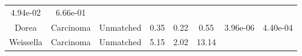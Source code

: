 \documentclass[12pt,]{article}
\begin{document}
\begin{longtable}[]{@{}cccccccc@{}}
\begin{minipage}[t]{0.06\columnwidth}
4.94e-02\strut
\end{minipage} & \begin{minipage}[t]{0.06\columnwidth}\centering\strut
6.66e-01\strut
\end{minipage}\tabularnewline
\begin{minipage}[t]{0.18\columnwidth}\centering\strut
Dorea\strut
\end{minipage} & \begin{minipage}[t]{0.07\columnwidth}\centering\strut
Carcinoma\strut
\end{minipage} & \begin{minipage}[t]{0.09\columnwidth}\centering\strut
Unmatched\strut
\end{minipage} & \begin{minipage}[t]{0.03\columnwidth}\centering\strut
0.35\strut
\end{minipage} & \begin{minipage}[t]{0.14\columnwidth}\centering\strut
0.22\strut
\end{minipage} & \begin{minipage}[t]{0.14\columnwidth}\centering\strut
0.55\strut
\end{minipage} & \begin{minipage}[t]{0.06\columnwidth}\centering\strut
3.96e-06\strut
\end{minipage} & \begin{minipage}[t]{0.06\columnwidth}\centering\strut
4.40e-04\strut
\end{minipage}\tabularnewline
\begin{minipage}[t]{0.18\columnwidth}\centering\strut
Weissella\strut
\end{minipage} & \begin{minipage}[t]{0.07\columnwidth}\centering\strut
Carcinoma\strut
\end{minipage} & \begin{minipage}[t]{0.09\columnwidth}\centering\strut
Unmatched\strut
\end{minipage} & \begin{minipage}[t]{0.03\columnwidth}\centering\strut
5.15\strut
\end{minipage} & \begin{minipage}[t]{0.14\columnwidth}\centering\strut
2.02\strut
\end{minipage} & \begin{minipage}[t]{0.14\columnwidth}\centering\strut
13.14\strut
\end{minipage} & \begin{minipage}[t]{0.06\columnwidth}\centering\strut

\end{minipage}
\end{longtable}
\end{document}
